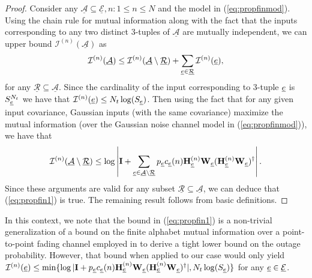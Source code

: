 \documentclass[11pt] {article}
\newcommand{\Ic} {{\mathcal I}}         \newcommand{\Ik} {{\bm {\mathcal I}}}
\newcommand{\Aulc} {{\underline{\mathcal A}}}
\newcommand{\Eulc} {{\underline{\mathcal E}}}
\newcommand{\Rulc} {{\underline{\mathcal R}}}
\begin{document}
  \begin{proof}
  Consider any $\Aulc\subseteq \Eulc, n:1\leq n\leq N$ and the model in (\ref{eq:propfinmod}).
     Using the chain rule for mutual information along with the fact that the inputs corresponding to any two distinct 3-tuples of $\Aulc$ are mutually independent, we can upper bound $\Ic^{(n)}(\Aulc)$ as
     \begin{eqnarray*}
     \Ic^{(n)}(\Aulc)\leq   \Ic^{(n)}(\Aulc\setminus\Rulc) + \sum_{\eul\in\Rulc}\Ic^{(n)}(\eul),
      \end{eqnarray*}
      for any $\Rulc\subseteq\Aulc$. Since the cardinality of the input corresponding to 3-tuple ${\underline e}$ is $S_{{\underline e}}^{N_t}$ we have that $\Ic^{(n)}(\eul)\leq N_t\log(S_{\eul})$. Then using the fact   that  for any given input covariance, Gaussian inputs (with the same covariance) maximize the mutual information (over the Gaussian noise channel model in (\ref{eq:propfinmod})), we have that
      \begin{eqnarray*}
       \Ic^{(n)}(\Aulc\setminus\Rulc)\leq \log\left|\Ib+\sum_{\eul\in\Aulc\setminus\Rulc}p_{\eul}c_{\eul}(n)\Hb_{\eul}^{(n)}\Wb_{\eul}(\Hb_{\eul}^{(n)}\Wb_{\eul})^{\dag}\right|. \end{eqnarray*}
       Since these arguments are valid for any subset $\Rulc\subseteq\Aulc$, we can deduce that (\ref{eq:propfin1}) is true.
    The remaining result follows from basic definitions.
      \end{proof}

In this context, we note that the bound in (\ref{eq:propfin1}) is a non-trivial generalization of a bound on the finite alphabet mutual information over a point-to-point fading channel employed in \cite{fabregas:LB} to derive a tight lower bound on the outage probability. However, that bound when applied to our case would only yield $\Ic^{(n)}(\eul)\leq\min\{\log|\Ib+p_{\eul}c_{\eul}(n)\Hb_{\eul}^{(n)}\Wb_{\eul}(\Hb_{\eul}^{(n)}\Wb_{\eul})^{\dag}|,  N_t\log(S_{\eul})\}$ for any $\eul\in\Eulc$.
\end{document}
